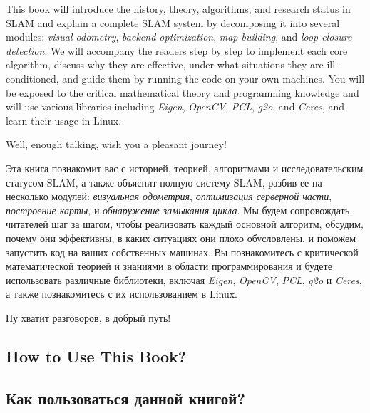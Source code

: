 \begin{English}
    This book will introduce the history, theory, algorithms, and research status in SLAM and explain a complete SLAM system by decomposing it into several modules: \textit{visual odometry}, \textit{backend optimization}, \textit{map building}, and \textit{loop closure detection}. We will accompany the readers step by step to implement each core algorithm, discuss why they are effective, under what situations they are ill-conditioned, and guide them by running the code on your own machines. You will be exposed to the critical mathematical theory and programming knowledge and will use various libraries including \textit{Eigen}, \textit{OpenCV}, \textit{PCL}, \textit{g2o}, and \textit{Ceres}, and learn their usage in Linux.
    
    Well, enough talking, wish you a pleasant journey!
\end{English}

\begin{Russian}
    Эта книга познакомит вас с историей, теорией, алгоритмами и исследовательским статусом SLAM, а также объяснит полную систему SLAM, разбив ее на несколько модулей: \textit{визуальная одометрия}, \textit{оптимизация серверной части}, \textit{построение карты}, и \textit{обнаружение замыкания цикла}. Мы будем сопровождать читателей шаг за шагом, чтобы реализовать каждый основной алгоритм, обсудим, почему они эффективны, в каких ситуациях они плохо обусловлены, и поможем запустить код на ваших собственных машинах. Вы познакомитесь с критической математической теорией и знаниями в области программирования и будете использовать различные библиотеки, включая \textit{Eigen}, \textit{OpenCV}, \textit{PCL}, \textit{g2o} и \textit{Ceres}, а также познакомитесь с их использованием в Linux.
    
    Ну хватит разговоров, в добрый путь!
\end{Russian}


\begin{English}
    \section*{How to Use This Book?}    
\end{English}

\begin{Russian}
    \section*{Как пользоваться данной книгой?}
\end{Russian}

